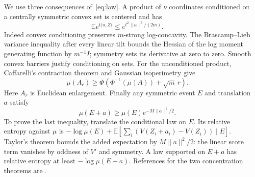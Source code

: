 \documentclass[11pt]{article}
\theoremstyle{remark}\newtheorem{remark}[theorem]{Remark}
\newcommand{\E}{\mathbb E}\newcommand{\Prb}{\mathbb P}\newcommand{\R}{\mathbb R}
\begin{document}
We use three consequences of~\eqref{eq:law}. A product of $\nu$
coordinates conditioned on a centrally symmetric convex set is centered
and has
\begin{equation}\label{eq:subgaussian}
 \E e^{t\langle u,Z\rangle}\leq e^{t^2\|u\|^2/(2m)}.
\end{equation}
Indeed convex conditioning preserves $m$-strong log-concavity. The
Brascamp--Lieb variance inequality after every linear tilt bounds the
Hessian of the log moment generating function by $m^{-1}I$; symmetry
sets its derivative at zero to zero. Smooth convex barriers justify
conditioning on sets. For the unconditioned product, Caffarelli's
contraction theorem and Gaussian isoperimetry give
\begin{equation}\label{eq:enlargement}
 \mu(A_r)\geq\Phi(\Phi^{-1}(\mu(A))+\sqrt m\,r).
\end{equation}
Here $A_r$ is Euclidean enlargement. Finally any symmetric event $E$ and
translation $a$ satisfy
\begin{equation}\label{eq:translation}
 \mu(E+a)\geq\mu(E)e^{-M\|a\|^2/2}.
\end{equation}
To prove the last inequality, translate the conditional law on $E$.
Its relative entropy against $\mu$ is
$-\log\mu(E)+\E[\sum_i(V(Z_i+a_i)-V(Z_i))\mid E]$.
Taylor's theorem bounds the added expectation by $M\|a\|^2/2$:
the linear score term vanishes by oddness of $V'$ and symmetry.
A law supported on $E+a$ has relative entropy at least $-\log\mu(E+a)$.
References for the two concentration theorems are
\cite{brascamp-lieb,caffarelli,ledoux}.
\end{document}
